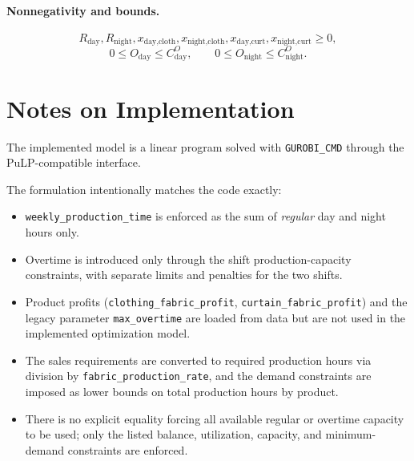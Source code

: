 \paragraph{Nonnegativity and bounds.}
\[
R_{\text{day}},R_{\text{night}},x_{\text{day,cloth}},x_{\text{night,cloth}},x_{\text{day,curt}},x_{\text{night,curt}} \ge 0,
\]
\[
0 \le O_{\text{day}} \le C^{O}_{\text{day}}, \qquad
0 \le O_{\text{night}} \le C^{O}_{\text{night}}.
\]

\section*{Notes on Implementation}

The implemented model is a linear program solved with \texttt{GUROBI\_CMD} through the PuLP-compatible interface.

The formulation intentionally matches the code exactly:
\begin{itemize}
\item \texttt{weekly\_production\_time} is enforced as the sum of \emph{regular} day and night hours only.
\item Overtime is introduced only through the shift production-capacity constraints, with separate limits and penalties for the two shifts.
\item Product profits (\texttt{clothing\_fabric\_profit}, \texttt{curtain\_fabric\_profit}) and the legacy parameter \texttt{max\_overtime} are loaded from data but are not used in the implemented optimization model.
\item The sales requirements are converted to required production hours via division by \texttt{fabric\_production\_rate}, and the demand constraints are imposed as lower bounds on total production hours by product.
\item There is no explicit equality forcing all available regular or overtime capacity to be used; only the listed balance, utilization, capacity, and minimum-demand constraints are enforced.
\end{itemize}
